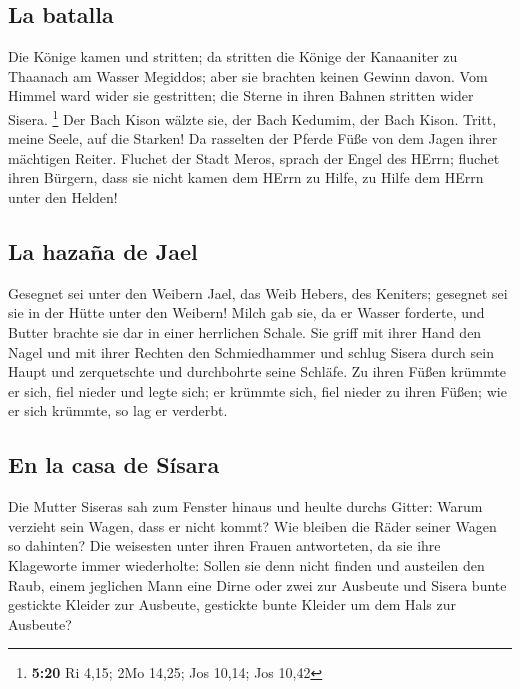 \hypertarget{la-batalla}{%
\subsection{La batalla}\label{la-batalla}}

 Die Könige kamen und stritten; da stritten die Könige
der Kanaaniter zu Thaanach am Wasser Megiddos; aber sie brachten keinen
Gewinn davon.  Vom Himmel ward wider sie gestritten; die
Sterne in ihren Bahnen stritten wider Sisera. \footnote{\textbf{5:20} Ri
  4,15; 2Mo 14,25; Jos 10,14; Jos 10,42}  Der Bach Kison
wälzte sie, der Bach Kedumim, der Bach Kison. Tritt, meine Seele, auf
die Starken!  Da rasselten der Pferde Füße von dem Jagen
ihrer mächtigen Reiter.  Fluchet der Stadt Meros, sprach
der Engel des HErrn; fluchet ihren Bürgern, dass sie nicht kamen dem
HErrn zu Hilfe, zu Hilfe dem HErrn unter den Helden!

\hypertarget{la-hazauxf1a-de-jael}{%
\subsection{La hazaña de Jael}\label{la-hazauxf1a-de-jael}}

 Gesegnet sei unter den Weibern Jael, das Weib Hebers,
des Keniters; gesegnet sei sie in der Hütte unter den Weibern!
 Milch gab sie, da er Wasser forderte, und Butter brachte
sie dar in einer herrlichen Schale.  Sie griff mit ihrer
Hand den Nagel und mit ihrer Rechten den Schmiedhammer und schlug Sisera
durch sein Haupt und zerquetschte und durchbohrte seine Schläfe.
 Zu ihren Füßen krümmte er sich, fiel nieder und legte
sich; er krümmte sich, fiel nieder zu ihren Füßen; wie er sich krümmte,
so lag er verderbt.

\hypertarget{en-la-casa-de-suxedsara}{%
\subsection{En la casa de Sísara}\label{en-la-casa-de-suxedsara}}

 Die Mutter Siseras sah zum Fenster hinaus und heulte
durchs Gitter: Warum verzieht sein Wagen, dass er nicht kommt? Wie
bleiben die Räder seiner Wagen so dahinten?  Die
weisesten unter ihren Frauen antworteten, da sie ihre Klageworte immer
wiederholte:  Sollen sie denn nicht finden und austeilen
den Raub, einem jeglichen Mann eine Dirne oder zwei zur Ausbeute und
Sisera bunte gestickte Kleider zur Ausbeute, gestickte bunte Kleider um
dem Hals zur Ausbeute?

